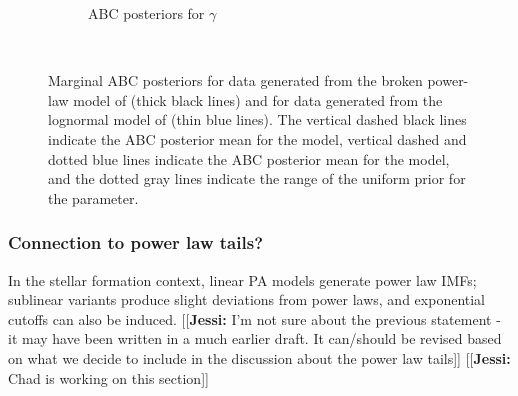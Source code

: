 \documentclass[12pt]{article}
\newcommand{\jessi}[1]{{\color{blue}[[\textbf{Jessi: }#1]]}}
\begin{document}
\begin{figure}[htbp]
\begin{subfigure}{0.32\textwidth}
\caption{ABC posteriors for $\gamma$}\label{subfig:kc_gamma}
\end{subfigure} \\
\caption{Marginal ABC posteriors for data generated from the broken power-law model of \cite{kroupa2001} (thick black lines)
and for data generated from the lognormal model of \cite{Chabrier:2003om, Chabrier:2003oq} (thin blue lines).  The vertical dashed black lines indicate the ABC posterior mean for the \cite{kroupa2001} model, vertical dashed and dotted blue lines indicate the ABC posterior mean for the \cite{Chabrier:2003om, Chabrier:2003oq} model, and the dotted gray lines indicate the range of the uniform prior for the parameter.  
 }
\label{fig:kroupa_chab_marginals}
\end{figure}




\subsubsection{Connection to power law tails?} \label{sec:powerlaw}
In the stellar formation context, linear PA models generate power law IMFs; sublinear variants produce slight deviations from power laws, 
and exponential cutoffs can also be induced. \jessi{I'm not sure about the previous statement - it may have been written in a much earlier draft.  It can/should be revised based on what we decide to include in the discussion about the power law tails}
\jessi{Chad is working on this section}
\end{document}

